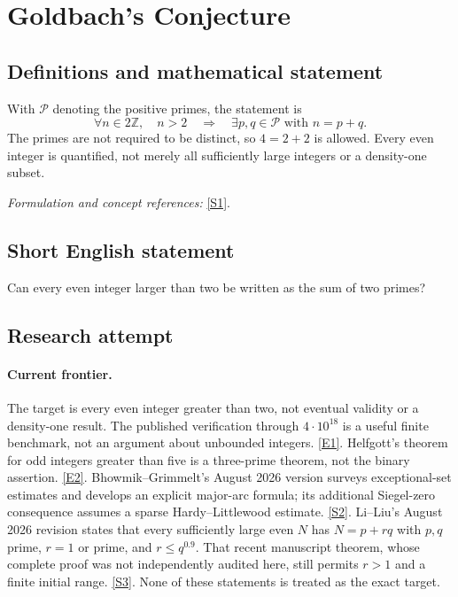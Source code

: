 \documentclass[11pt,a4paper]{article}
\newcommand{\Z}{\mathbb{Z}}
\newcommand{\sref}[2]{\hyperlink{source:#1:#2}{[S#2]}}
\newcommand{\eref}[2]{\hyperlink{extra:#1:#2}{[E#2]}}
\newif\ifshowcatalogue
\newcommand{\cataloguescope}[1]{\ifshowcatalogue
 \paragraph{Exact scope in the supplied catalogue.}
 \begin{quote}\small #1\end{quote}\fi}
\numberwithin{equation}{section}
\begin{document}
\setcounter{section}{0}
\clearpage
\section*{\texorpdfstring{Goldbach's Conjecture}{Goldbach's Conjecture}}\label{12}
\subsection{Definitions and mathematical statement}
With $\mathcal P$ denoting the positive primes, the statement is
\[
 \forall n\in2\Z,\quad n>2\quad\Longrightarrow\quad
 \exists p,q\in\mathcal P\text{ with }n=p+q.
\]
The primes are not required to be distinct, so $4=2+2$ is allowed. Every even integer is quantified, not merely all sufficiently large integers or a density-one subset.
\par\smallskip\textit{Formulation and concept references:} \sref{12}{1}.
\cataloguescope{Prove or disprove that every even integer n greater than 2 is the sum of two primes.}
\subsection{Short English statement}
Can every even integer larger than two be written as the sum of two primes?
\subsection{Research attempt}

\paragraph{Current frontier.}
The target is every even integer greater than two, not eventual validity
or a density-one result. The published verification through $4\cdot10^{18}$
is a useful finite benchmark, not an argument about unbounded integers.
\eref{12}{1}. Helfgott's theorem for odd integers greater than five is a
three-prime theorem, not the binary assertion. \eref{12}{2}.
Bhowmik--Grimmelt's August 2026 version surveys exceptional-set estimates
and develops an explicit major-arc formula; its additional Siegel-zero
consequence assumes a sparse Hardy--Littlewood estimate. \sref{12}{2}.
Li--Liu's August 2026 revision states that every sufficiently large even
$N$ has $N=p+rq$ with $p,q$ prime, $r=1$ or prime, and $r\le q^{0.9}$.
That recent manuscript theorem, whose complete proof was not independently
audited here, still permits $r>1$ and a finite initial range.
\sref{12}{3}. None of these statements is treated as the exact target.
\end{document}
